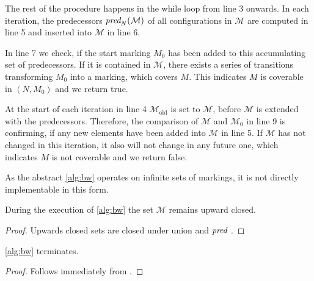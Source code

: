 The rest of the procedure happens in the while loop from line 3 onwards. In each iteration, the predecessors $\operatorname{\textit{pred}}_{N}(\mathcal{M})$ of all configurations in $\mathcal{M}$ are computed in line 5 and inserted into $\mathcal{M}$ in line 6. 
\par
In line 7 we check, if the start marking $M_{0}$ has been added to this accumulating set of predecessors. If it is contained in $\mathcal{M}$, there exists a series of transitions transforming $M_{0}$ into a marking, which covers $M$. This indicates $M$ is coverable in $(N,M_{0})$ and we return true. 
\par
At the start of each iteration in line 4 $\mathcal{M}_{\text{old}}$ is set to $\mathcal{M}$, before $\mathcal{M}$ is extended with the predecessors. Therefore, the comparison of $\mathcal{M}$ and $\mathcal{M}_{0}$ in line 9 is confirming, if any new elements have been added into $\mathcal{M}$ in line 5. If $\mathcal{M}$ has not changed in this iteration, it also will not change in any future one, which indicates $M$ is not coverable and we return false.
\par
As the abstract \autoref{alg:bw} operates on infinite sets of markings, it is not directly implementable in this form. 

\begin{lemma}\label{lem:upwclosed}
During the execution of \autoref{alg:bw} the set $\mathcal{M}$ remains upward closed. 
\end{lemma}
\begin{proof}
Upwards closed sets are closed under union and $\operatorname{\textit{pred}}$ {\cite[Lemma~3.2.16]{esparza_19}}. 
\end{proof}


\begin{lemma}\label{lem:bwterm}
\autoref{alg:bw} terminates. 
\end{lemma}
\begin{proof}
Follows immediately from {\cite[Lemma~3.2.17]{esparza_19}}.
\end{proof}

